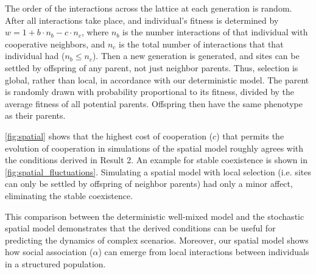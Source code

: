 \documentclass[12pt]{extarticle}
\begin{document}
{The order of the interactions across the lattice at each generation is random.
After all interactions take place, and individual's fitness is determined by
$w = 1 + b \cdot n_b - c \cdot n_c$,
where $n_b$ is the number interactions of that individual with cooperative neighbors, and $n_c$ is the total number of interactions that that individual  had ($n_b \le n_c$).
Then a new generation is generated, and sites can be settled by offspring of any parent, not just neighbor parents. Thus, selection is global, rather than local, in accordance with our deterministic model.
The parent is randomly drawn with probability proportional to its fitness, divided by the average fitness of all potential parents.
Offspring then have the same phenotype as their parents.

\autoref{fig:spatial} shows that the highest cost of cooperation ($c$) that permits the evolution of cooperation in simulations of the spatial model roughly agrees with the conditions derived in Result 2.
An example for stable coexistence is shown in \autoref{fig:spatial_fluctuations}.
Simulating a spatial model with local selection (i.e. sites can only be settled by offspring of neighbor parents) had only a minor affect, eliminating the stable coexistence. 

This comparison between the deterministic well-mixed model and the stochastic spatial model demonstrates that the derived conditions can be useful for predicting the dynamics of complex scenarios. 
Moreover, our spatial model shows how social association ($\alpha$) can emerge from local interactions between individuals in a structured population.


}
\end{document}
